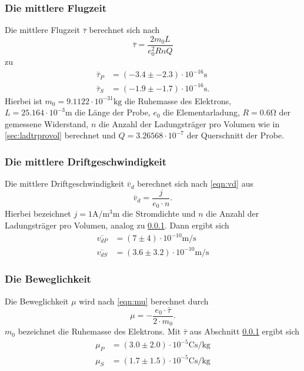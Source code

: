     \subsubsection{Die mittlere Flugzeit}
    \label{sec:mitflugz}
      Die mittlere Flugzeit $\bar{\tau}$ berechnet sich nach
      \begin{equation*}
        \bar{\tau} = \frac{2m_{0}L}{e_{0}^{2}RnQ}
      \end{equation*}
      zu
      \begin{align*}
        \bar{\tau}_{P} & = (-3.4 \pm -2.3) \cdot 10^{-16} \si{\second} \\
        \bar{\tau}_{S} & = (-1.9 \pm -1.7) \cdot 10^{-16} \si{\second}.
      \end{align*}
      Hierbei ist $m_{0} = 9.1122 \cdot 10^{-31} \si{\kilo\gram}$ die Ruhemasse des Elektrons, $L = 25.164 \cdot 10^{-3} \si{\meter}$ die Länge der Probe,
      $e_{0}$ die Elementarladung, $R = 0.6 \si{\ohm}$ der gemessene Widerstand, $n$ die Anzahl der Ladungsträger pro Volumen wie in \ref{sec:ladtrprovol} berechnet
      und $Q = 3.26568 \cdot 10^{-7}$ der Querschnitt der Probe.
    \subsubsection{Die mittlere Driftgeschwindigkeit}
      Die mittlere Driftgeschwindigkeit $\bar{v}_d$ berechnet sich nach \ref{eqn:vd} aus
      \begin{equation}
        \bar{v}_d = \frac{j}{e_{0} \cdot n}.
      \end{equation}
      Hierbei bezeichnet $j = 1 \si{\ampere\per\cubic\milli\meter}$ die Stromdichte und $n$ die Anzahl der Ladungsträger pro Volumen, analog zu \ref{sec:mitflugz}.
      Dann ergibt sich
      \begin{align*}
        \bar{v_{dP}} & = (7 \pm 4) \cdot 10^{-10} \si{\meter\per\second} \\
        \bar{v_{dS}} & = (3.6 \pm 3.2) \cdot 10^{-10} \si{\meter\per\second}
      \end{align*}
    \subsubsection{Die Beweglichkeit}
      Die Beweglichkeit $\mu$ wird nach \ref{eqn:mu} berechnet durch
      \begin{equation}
        \mu = -\frac{e_{0} \cdot \bar{\tau}}{2 \cdot m_{0}}.
      \end{equation}
      $m_{0}$ bezeichnet die Ruhemasse des Elektrons. Mit $\bar{\tau}$ aus Abschnitt \ref{sec:mitflugz} ergibt sich
      \begin{align*}
        \mu_{P} & = (3.0 \pm 2.0) \cdot 10^{-5} \si{\coulomb\second\per\kilo\gram}\\
        \mu_{S} & = (1.7 \pm 1.5) \cdot 10^{-5} \si{\coulomb\second\per\kilo\gram}
      \end{align*}
